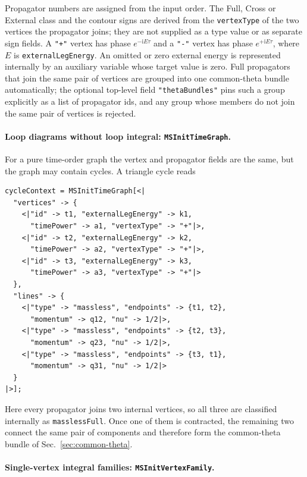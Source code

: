 \documentclass[11pt,a4paper]{article}
\newcommand{\ii}{\mathrm i}
\begin{document}
Propagator numbers are assigned from the input order. The Full, Cross or External class and the contour signs are derived from the \texttt{vertexType} of the two vertices the propagator joins; they are not supplied as a type value or as separate sign fields. A \texttt{"+"} vertex has phase $e^{-\ii E\tau}$ and a \texttt{"-"} vertex has phase $e^{+\ii E\tau}$, where $E$ is \texttt{externalLegEnergy}. An omitted or zero external energy is represented internally by an auxiliary variable whose target value is zero. Full propagators that join the same pair of vertices are grouped into one common-theta bundle automatically; the optional top-level field \texttt{"thetaBundles"} pins such a group explicitly as a list of propagator ids, and any group whose members do not join the same pair of vertices is rejected.
\paragraph{Loop diagrams without loop integral: \texttt{MSInitTimeGraph}.}

For a pure time-order graph the vertex and propagator fields are the same, but the graph may contain
cycles. A triangle cycle reads
\begin{verbatim}
cycleContext = MSInitTimeGraph[<|
  "vertices" -> {
    <|"id" -> t1, "externalLegEnergy" -> k1,
      "timePower" -> a1, "vertexType" -> "+"|>,
    <|"id" -> t2, "externalLegEnergy" -> k2,
      "timePower" -> a2, "vertexType" -> "+"|>,
    <|"id" -> t3, "externalLegEnergy" -> k3,
      "timePower" -> a3, "vertexType" -> "+"|>
  },
  "lines" -> {
    <|"type" -> "massless", "endpoints" -> {t1, t2},
      "momentum" -> q12, "nu" -> 1/2|>,
    <|"type" -> "massless", "endpoints" -> {t2, t3},
      "momentum" -> q23, "nu" -> 1/2|>,
    <|"type" -> "massless", "endpoints" -> {t3, t1},
      "momentum" -> q31, "nu" -> 1/2|>
  }
|>];
\end{verbatim}
Here every propagator joins two internal vertices, so all three are classified internally as
\texttt{masslessFull}. Once one of them is contracted, the remaining two connect the same pair of
components and therefore form the common-theta bundle of Sec.~\ref{sec:common-theta}.

\paragraph{Single-vertex integral families: \texttt{MSInitVertexFamily}.}
\end{document}

